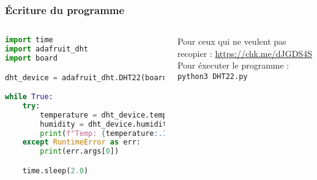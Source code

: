 \documentclass[aspectratio=169,xcolor=dvipsnames]{beamer}
\begin{document}
\begin{frame}[fragile]
\frametitle{Écriture du programme}
    \begin{columns}[c] %

        \begin{lstlisting}[language=Python, caption=DHT22.py]
import time
import adafruit_dht
import board

dht_device = adafruit_dht.DHT22(board.D4)

while True:
    try:
        temperature = dht_device.temperature
        humidity = dht_device.humidity
        print(f"Temp: {temperature:.1f}C / Humi: {humidity:.1f}%")
    except RuntimeError as err:
        print(err.args[0])

    time.sleep(2.0)
        \end{lstlisting}

        Pour ceux qui ne veulent pas recopier :
        \url{https://chk.me/dJGDS4S} \\
        \vspace{5mm}
        Pour éxecuter le programme :
        \texttt{python3 DHT22.py}
    \end{columns}
\end{frame}
\end{document}
